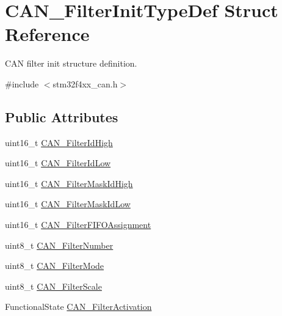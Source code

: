 \hypertarget{struct_c_a_n___filter_init_type_def}{}\section{C\+A\+N\+\_\+\+Filter\+Init\+Type\+Def Struct Reference}
\label{struct_c_a_n___filter_init_type_def}


C\+A\+N filter init structure definition.  




{\ttfamily \#include $<$stm32f4xx\+\_\+can.\+h$>$}

\subsection*{Public Attributes}
\begin{DoxyCompactItemize}
\item 
uint16\+\_\+t \hyperlink{struct_c_a_n___filter_init_type_def_afc109aa8eedced09d296605f2eb871f7}{C\+A\+N\+\_\+\+Filter\+Id\+High}
\item 
uint16\+\_\+t \hyperlink{struct_c_a_n___filter_init_type_def_ab8c56b48ac323e8c7a1b535c79a51f87}{C\+A\+N\+\_\+\+Filter\+Id\+Low}
\item 
uint16\+\_\+t \hyperlink{struct_c_a_n___filter_init_type_def_a6f34539615e6484f266b46aa8f362a91}{C\+A\+N\+\_\+\+Filter\+Mask\+Id\+High}
\item 
uint16\+\_\+t \hyperlink{struct_c_a_n___filter_init_type_def_a0f052daf04b0a481ecfa5c2cc8058089}{C\+A\+N\+\_\+\+Filter\+Mask\+Id\+Low}
\item 
uint16\+\_\+t \hyperlink{struct_c_a_n___filter_init_type_def_a01ba491f12097adcc9f0a3d627628d55}{C\+A\+N\+\_\+\+Filter\+F\+I\+F\+O\+Assignment}
\item 
uint8\+\_\+t \hyperlink{struct_c_a_n___filter_init_type_def_af94466e1138c2b4fe6a67cf556981193}{C\+A\+N\+\_\+\+Filter\+Number}
\item 
uint8\+\_\+t \hyperlink{struct_c_a_n___filter_init_type_def_a7cfb23c48aad13a058c2619dbc062d8a}{C\+A\+N\+\_\+\+Filter\+Mode}
\item 
uint8\+\_\+t \hyperlink{struct_c_a_n___filter_init_type_def_a9d52661aca538dbfcafdda6f16dddc82}{C\+A\+N\+\_\+\+Filter\+Scale}
\item 
Functional\+State \hyperlink{struct_c_a_n___filter_init_type_def_a0225afda33b565f358ca75bdaa780074}{C\+A\+N\+\_\+\+Filter\+Activation}
\end{DoxyCompactItemize}


